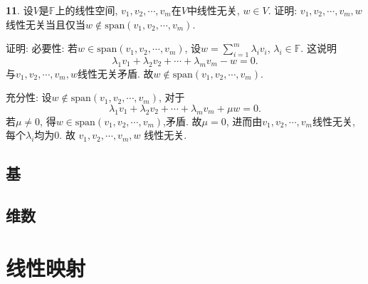 \documentclass[12pt,a4paper]{article}
\begin{document}
\begin{CJK*}{GBK}{song}
\par \textbf{11}. 设$V$是$\mathbb{F}$上的线性空间, $v_1,v_2,\cdots,v_m$在$V$中线性无关, $w\in V$. 证明: $v_1,v_2,\cdots,v_m,w$线性无关当且仅当$w \notin \text{span}(v_1,v_2,\cdots,v_m)$.
\par 证明: 必要性: 若$w \in \text{span}(v_1,v_2,\cdots,v_m)$, 设$w=\sum_{i=1}^m \lambda_i v_i$, $\lambda_i \in \mathbb{F}$. 这说明
\begin{displaymath}
\lambda_1 v_1+\lambda_2 v_2+\cdots+\lambda_m v_m-w=0.
\end{displaymath}
与$v_1,v_2,\cdots,v_m,w$线性无关矛盾. 故$w \notin \text{span}(v_1,v_2,\cdots,v_m)$.
\par 充分性: 设$w \notin \text{span}(v_1,v_2,\cdots,v_m)$, 对于
\begin{displaymath}
\lambda_1 v_1+\lambda_2 v_2+\cdots+\lambda_m v_m+\mu w=0.
\end{displaymath}
若$\mu \neq 0$, 得$w \in \text{span}(v_1,v_2,\cdots,v_m)$,矛盾. 故$\mu=0$, 进而由$v_1,v_2,\cdots,v_m$线性无关, 每个$\lambda_i$均为0. 故 $v_1,v_2,\cdots,v_m,w$ 线性无关.

\subsection{基}

\subsection{维数}

\section{线性映射}

\end{CJK*}
\end{document}
